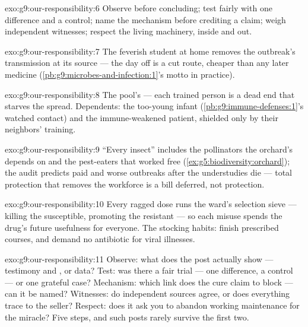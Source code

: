 \begin{solution}{exo:g9:our-responsibility:6}
Observe before concluding; test fairly with one
difference and a control; name the mechanism before
crediting a claim; weigh independent witnesses; respect
the living machinery, inside and out.
\end{solution}

\begin{solution}{exo:g9:our-responsibility:7}
The feverish student at home removes the outbreak's
transmission at its source --- the day off is a cut
route, cheaper than any later medicine
(\cref{pb:g9:microbes-and-infection:1}'s motto in
practice).
\end{solution}

\begin{solution}{exo:g9:our-responsibility:8}
The pool's --- each trained person is a dead end that
starves the spread. Dependents: the too-young infant
(\cref{pb:g9:immune-defenses:1}'s watched contact) and
the immune-weakened patient, shielded only by their
neighbors' training.
\end{solution}

\begin{solution}{exo:g9:our-responsibility:9}
``Every insect'' includes the pollinators the orchard's
 depends on and the pest-eaters that worked free
(\cref{ex:g5:biodiversity:orchard}); the audit predicts
paid  and worse outbreaks after the
understudies die --- total protection that removes the
workforce is a bill deferred, not protection.
\end{solution}

\begin{solution}{exo:g9:our-responsibility:10}
Every ragged dose runs the ward's selection sieve ---
killing the susceptible, promoting the resistant --- so
each misuse spends the drug's future usefulness for
everyone. The stocking habits: finish prescribed courses,
and demand no antibiotic for viral illnesses.
\end{solution}

\begin{solution}{exo:g9:our-responsibility:11}
Observe: what does the post actually show --- testimony
and , or data? Test: was there a fair trial ---
one difference, a control --- or one grateful case?
Mechanism: which link does the cure claim to block ---
can it be named? Witnesses: do independent sources
agree, or does everything trace to the seller? Respect:
does it ask you to abandon working maintenance for the
miracle? Five steps, and such posts rarely survive the
first two.
\end{solution}

